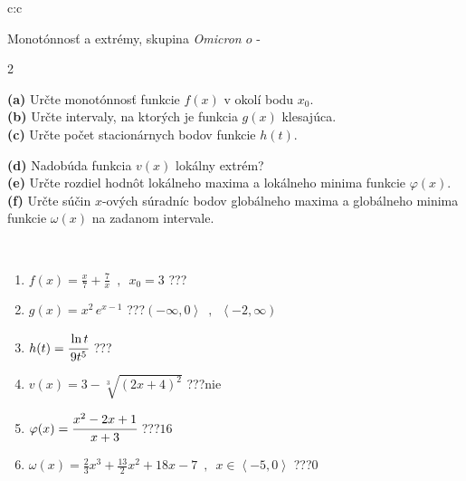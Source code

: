 \documentclass[10pt]{report}
\newcommand\omicron{o}
\begin{document}
\newpage
\thispagestyle{empty}
\begin{tabular}{c:c}
\begin{minipage}[c][104.5mm][t]{0.5\linewidth}
\begin{center}
\vspace{7mm}
{\huge Monotónnosť a extrémy, skupina \textit{Omicron $\omicron$} -}\\[5mm]
\begin{minipage}{0.95\linewidth}
\begin{center}
{\small \begin{multicols}{2} \raggedright
\textbf{(a)} Určte monotónnosť funkcie \(f(x)\) v okolí bodu \(x_0\). \\[1mm]
\textbf{(b)} Určte intervaly, na ktorých je funkcia \(g(x)\) klesajúca. \\[1mm]
\textbf{(c)} Určte počet stacionárnych bodov funkcie \(h(t)\). \par \columnbreak
\textbf{(d)} Nadobúda funkcia \(v(x)\) lokálny extrém? \\[1mm]
\textbf{(e)} Určte rozdiel hodnôt lokálneho maxima a lokálneho minima funkcie \(\varphi(x)\). \\[1mm]
\textbf{(f)} Určte súčin \(x\)-ových súradníc bodov globálneho maxima a globálneho minima funkcie \(\omega(x)\) na zadanom intervale. \\[1mm]
\end{multicols}
}
\end{center}
\end{minipage}
\\[4mm]
\begin{minipage}{0.79\linewidth}
\begin{center}
\begin{varwidth}{\linewidth}
\begin{enumerate}
\normalsize
\item $f(x)=\frac{x}{7}+\frac{7}{x} \enspace , \enspace x_0=3$\quad \dotfill\; ???\;\dotfill \quad {}
\item $g(x)=x^2\, e^{x-1}$\quad \dotfill\; ???\;\dotfill \quad $\left(-\infty , 0\right\rangle\enspace , \enspace \left\langle-2 , \infty\right)$
\item $h(t)=\cfrac{\ln t}{9t^5}$\quad \dotfill\; ???\;\dotfill {}
\item $v(x)=3-\sqrt[3]{(2x+4)^2}$\quad \dotfill\; ???\;\dotfill \quad $\text{nie}$
\item $\varphi(x)=\cfrac{x^2-2x+1}{x+3}$\quad \dotfill\; ???\;\dotfill \quad $16$
\item $\omega(x)=\frac{2}{3}x^3+\frac{13}{2}x^2+18x-7 \enspace , \enspace x\in\left\langle-5 , 0\right\rangle$\quad \dotfill\; ???\;\dotfill \quad $0$

\end{enumerate}
\end{varwidth}
\end{center}
\end{minipage}
\end{center}
\end{minipage}
\end{tabular}
\end{document}
